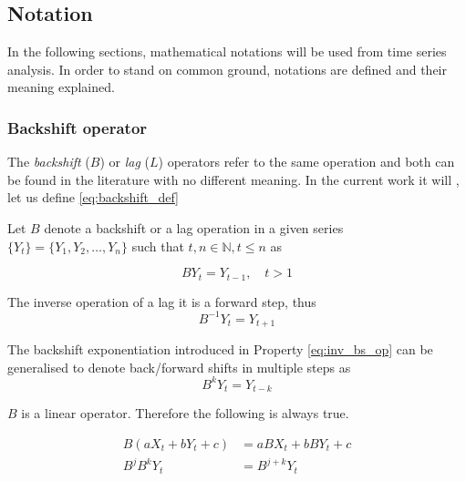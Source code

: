 \subsection{Notation}

In the following sections, mathematical notations will be used from time series analysis. In order to stand on common ground,  notations are defined and their meaning explained.

\subsubsection*{Backshift operator}

The \emph{backshift} ($B$) or \emph{lag} ($L$) operators refer to the same operation and both can be found in the literature with no different meaning. In the current work it will , let us define \ref{eq:backshift_def}

\begin{definition}
	\label{eq:backshift_def}
	Let $B$ denote a backshift or a lag operation in a given series $\{Y_t\} = \{Y_1, Y_2, \ldots, Y_n\}$ such that $ t,n \in \mathbb{N}, t \leq n$ as 
	
	\begin{equation}
		B Y_t = Y_{t-1}, \quad t>1
	\end{equation}
\end{definition}

\begin{property}
	\label{eq:inv_bs_op}
	The inverse operation of a lag it is a forward step, thus
	\begin{equation}
		B^{-1}Y_t = Y_{t+1}
	\end{equation}
\end{property}

\begin{property}
	The backshift exponentiation introduced in Property \ref{eq:inv_bs_op} can be generalised to denote back/forward shifts in multiple steps as	
	\begin{equation}
		B^{k}Y_t = Y_{t-k}
	\end{equation}
\end{property}


\begin{property}
	$B$ is a linear operator. Therefore the following is always true.
	
	\begin{align}
		B(aX_t + bY_t + c) &= aBX_t + bBY_t + c \\
		B^jB^k Y_t &= B^{j+k}Y_t
	\end{align}
\end{property}

